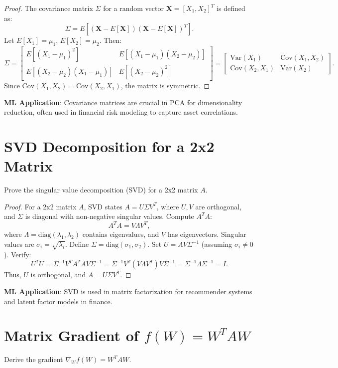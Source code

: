 \documentclass{article}
\theoremstyle{plain}
\theoremstyle{definition}
\newtheorem{proof}
\begin{document}
\begin{proof}
The covariance matrix $\Sigma$ for a random vector $\mathbf{X} = [X_1, X_2]^T$ is defined as:
\[
\Sigma = E[(\mathbf{X} - E[\mathbf{X}]) (\mathbf{X} - E[\mathbf{X}])^T].
\]
Let $E[X_1] = \mu_1$, $E[X_2] = \mu_2$. Then:
\[
\Sigma = \begin{bmatrix}
E[(X_1 - \mu_1)^2] & E[(X_1 - \mu_1)(X_2 - \mu_2)] \\
E[(X_2 - \mu_2)(X_1 - \mu_1)] & E[(X_2 - \mu_2)^2]
\end{bmatrix} = \begin{bmatrix}
\text{Var}(X_1) & \text{Cov}(X_1, X_2) \\
\text{Cov}(X_2, X_1) & \text{Var}(X_2)
\end{bmatrix}.
\]
Since $\text{Cov}(X_1, X_2) = \text{Cov}(X_2, X_1)$, the matrix is symmetric.
\end{proof}
\textbf{ML Application}: Covariance matrices are crucial in PCA for dimensionality reduction, often used in financial risk modeling to capture asset correlations.

\section{SVD Decomposition for a 2x2 Matrix}
Prove the singular value decomposition (SVD) for a 2x2 matrix $A$.

\begin{proof}
For a 2x2 matrix $A$, SVD states $A = U \Sigma V^T$, where $U, V$ are orthogonal, and $\Sigma$ is diagonal with non-negative singular values. Compute $A^T A$:
\[
A^T A = V \Lambda V^T,
\]
where $\Lambda = \text{diag}(\lambda_1, \lambda_2)$ contains eigenvalues, and $V$ has eigenvectors. Singular values are $\sigma_i = \sqrt{\lambda_i}$. Define $\Sigma = \text{diag}(\sigma_1, \sigma_2)$. Set $U = A V \Sigma^{-1}$ (assuming $\sigma_i \neq 0$). Verify:
\[
U^T U = \Sigma^{-1} V^T A^T A V \Sigma^{-1} = \Sigma^{-1} V^T (V \Lambda V^T) V \Sigma^{-1} = \Sigma^{-1} \Lambda \Sigma^{-1} = I.
\]
Thus, $U$ is orthogonal, and $A = U \Sigma V^T$.
\end{proof}
\textbf{ML Application}: SVD is used in matrix factorization for recommender systems and latent factor models in finance.

\section{Matrix Gradient of $f(W) = W^T A W$}
Derive the gradient $\nabla_W f(W) = W^T A W$.
\end{document}
